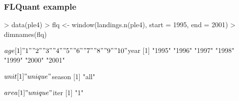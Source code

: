 \documentclass{beamer}%
\begin{document}
\begin{frame}[containsverbatim]

  \frametitle{FLQuant example}

{\tiny{
\begin{Schunk}
\begin{Sinput}
> data(ple4)
> flq <- window(landings.n(ple4), start = 1995, end = 2001)
> dimnames(flq)
\end{Sinput}
\begin{Soutput}
$age
 [1] "1"  "2"  "3"  "4"  "5"  "6"  "7"  "8"  "9"  "10"

$year
[1] "1995" "1996" "1997" "1998" "1999" "2000" "2001"

$unit
[1] "unique"

$season
[1] "all"

$area
[1] "unique"

$iter
[1] "1"
\end{Soutput}
\end{Schunk}
}}

\end{frame}
\end{document}
